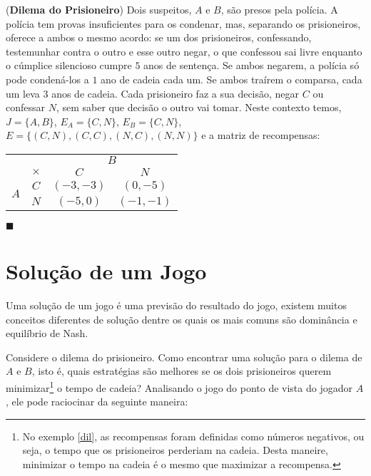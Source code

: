 \begin{ex}\label{dil}
(\textbf{Dilema do Prisioneiro}) Dois suspeitos, $A$ e $B$, são presos pela polícia. A polícia tem provas insuficientes para os condenar, mas, separando os prisioneiros, oferece a ambos o mesmo acordo: se um dos prisioneiros, confessando, testemunhar contra o outro e esse outro negar, o que confessou sai livre enquanto o cúmplice silencioso cumpre $5$ anos de sentença. Se ambos negarem, a polícia só pode condená-los a $1$ ano de cadeia cada um. Se ambos traírem o comparsa, cada um leva $3$ anos de cadeia. Cada prisioneiro faz a sua decisão, negar $C$ ou confessar $N$, sem saber que decisão o outro vai tomar. Neste contexto temos, $J=\{A,B\}$, $E_A=\{C,N\}$, $E_B=\{C,N\}$, $E=\{(C,N),(C,C),(N,C),(N,N)\}$ e a matriz de recompensas:

\begin{center}
\begin{tabular}[H]{c|c|c|c|}
\multicolumn{2}{c}{} & \multicolumn{2}{c}{$B$} \\\cline{2-4}
& $\times$ & $C$ & $N$\\\cline{2-4}
\multirow{2}{*}{$A$} & $C$ & $(-3,-3)$ & $(0,-5)$ \\\cline{2-4}
& $N$ & $(-5,0)$ & $(-1,-1)$ \\\cline{2-4}
\end{tabular}
\end{center}\vspace{1cm}

\hfill$\blacksquare$

\end{ex}

\section{Solução de um Jogo}

Uma solução de um jogo é uma previsão do resultado do jogo, existem muitos conceitos diferentes de solução dentre os quais os mais comuns são dominância e equilíbrio de Nash.

Considere o dilema do prisioneiro. Como encontrar uma solução para o dilema de $A$ e $B$, isto é, quais estratégias são melhores se os dois prisioneiros querem minimizar\footnote{No exemplo \ref{dil}, as recompensas foram definidas como números negativos, ou seja, o tempo que os prisioneiros perderiam na cadeia. Desta maneire, minimizar o tempo na cadeia é o mesmo que maximizar a recompensa.} o tempo de cadeia? Analisando o jogo do ponto de vista do jogador $A$, ele pode raciocinar da seguinte maneira:

